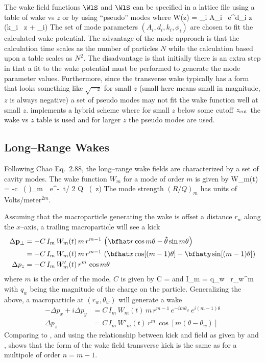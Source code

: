 The wake field functions $\WlS$ and $\WlS$ can be specified in a \bmad
lattice file using a table of wake vs $z$ or by using ``pseudo'' modes
where
\Begineq
  W(z) = \sum_i A_i \, e^{d_i z} \, \sin (k_i \, z + \phi_i)
  \label{wadzk}
\Endeq
The set of mode parameters $(A_i, d_i, k_i, \phi_i)$ are chosen to fit
the calculated wake potential. The advantage of the mode approach is that
the calculation time scales as the number of particles $N$ while the
calculation based upon a table scales as $N^2$. The disadvantage is that
initially there is an extra step in that a fit to the wake potential must
be performed to generate the mode parameter values. Furthermore, since the
transverse wake typically has a form that looks something like $\sqrt{-z}$ 
for small $z$ (small here means small in magnitude, $z$ is always negative)
a set of pseudo modes may not fit the wake function well at small $z$. 
\bmad implements a hybrid scheme where for small $z$ below some cutoff
$z_{\rm{cut}}$ the wake vs $z$ table is used and for larger $z$ the pseudo
modes are used.


\subsection{Long--Range Wakes}

Following Chao\cite{b:chao} Eq.~2.88, the long--range wake fields are
characterized by a set of cavity modes. The wake function $W_m$ for a
mode of order $m$ is given by
\Begineq
  W_m(t) = -c \, \left(  \right)_m \,\,
  e^{-\omega \, t/ 2 Q} \, \sin (\omega \, z)
  \label{wcrq}
\Endeq
The mode strength $(R/Q)_m$ has units of Volts/meter$^{2m}$.

Assuming that the macroparticle generating the wake is offset a
distance $r_w$ along the $x$--axis, a trailing macroparticle will see a kick
\begin{align}
  \Delta {\Bf p}_\perp &= 
    -C \, I_m \, W_m(t) \, m \, r^{m-1} \, \left( 
    \bfhat r \cos m\theta - {\bf\hat\theta} \sin m\theta \right) \\
  &= -C \, I_m \, W_m(t) \, m \, r^{m-1} \, \left( 
    \bfhat x \cos [(m-1) \theta] - 
    \bfhat y \sin [(m-1)\theta] \right) \CRNO
  \Delta p_z &= -C \, I_m \, W'_m(t) \, r^m \, \cos m\theta
\end{align}
where $m$ is the order of the mode, $C$ is given by
\Begineq
  C = 
\Endeq
 and
\Begineq
  I_m = q_w \, r_w^m
\Endeq
with $q_w$ being the magnitude of the charge on the particle. 
Generalizing the above, a macroparticle at $(r_w, \theta_w)$ will generate a wake
\begin{align}
  -\Delta p_x + i\Delta p_y &= C \, I_m \, W_m(t) \, 
    m \, r^{m-1} \, e^{-i m \theta_w} \, e^{i (m-1) \theta} 
    \label{ppcimr} \\
  \Delta p_z &= C \, I_m \, W'_m(t) \, r^m \, \cos [m(\theta - \theta_w)]
    \label{pciwr}
\end{align}
Comparing  to , and using the relationship between
kick and field as given by  and , shows that
the form of the wake field transverse kick is the same as for a
multipole of order $n = m - 1$. 

